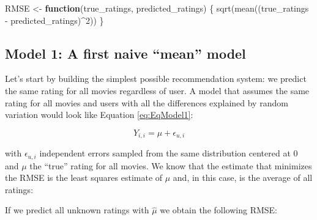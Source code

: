 \documentclass[
]{article}
\newenvironment{Shaded}{}{}
\newcommand{\ControlFlowTok}[1]{\textcolor[rgb]{0.00,0.44,0.13}{\textbf{#1}}}
\newcommand{\DecValTok}[1]{\textcolor[rgb]{0.25,0.63,0.44}{#1}}
\newcommand{\FloatTok}[1]{\textcolor[rgb]{0.25,0.63,0.44}{#1}}
\newcommand{\FunctionTok}[1]{\textcolor[rgb]{0.02,0.16,0.49}{#1}}
\newcommand{\NormalTok}[1]{#1}
\newcommand{\OtherTok}[1]{\textcolor[rgb]{0.00,0.44,0.13}{#1}}
\newcommand{\SpecialCharTok}[1]{\textcolor[rgb]{0.25,0.44,0.63}{#1}}
\begin{document}
\begin{Shaded}
\begin{Highlighting}[]
\NormalTok{RMSE }\OtherTok{\textless{}{-}} \ControlFlowTok{function}\NormalTok{(true\_ratings, predicted\_ratings) \{}
    \FunctionTok{sqrt}\NormalTok{(}\FunctionTok{mean}\NormalTok{((true\_ratings }\SpecialCharTok{{-}}\NormalTok{ predicted\_ratings)}\SpecialCharTok{\^{}}\DecValTok{2}\NormalTok{))}
\NormalTok{\}}
\end{Highlighting}
\end{Shaded}

\newpage

\hypertarget{model-1-a-first-naive-mean-model}{%
\subsection{Model 1: A first naive ``mean''
model}\label{model-1-a-first-naive-mean-model}}

Let's start by building the simplest possible recommendation system: we
predict the same rating for all movies regardless of user. A model that
assumes the same rating for all movies and users with all the
differences explained by random variation would look like Equation
\ref{eq:EqModel1}:

%
\par

\label{eq:EqModel1} \begin{equation}
  Y_{i,i} = \mu + \epsilon_{u,i}
\end{equation}

with \(\epsilon_{u,i}\) independent errors sampled from the same
distribution centered at 0 and \(\mu\) the ``true'' rating for all
movies. We know that the estimate that minimizes the RMSE is the least
squares estimate of \(\mu\) and, in this case, is the average of all
ratings:

\begin{Shaded}
\end{Shaded}

If we predict all unknown ratings with \(\hat\mu\) we obtain the
following RMSE:
\end{document}
